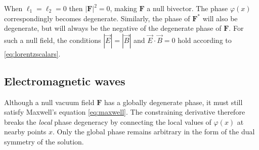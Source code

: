 \documentclass[1p,sort&compress]{elsarticle}
\numberwithin{equation}{section}
\newcommand{\rv}[1]{\vec{#1}}
\newcommand{\bv}[1]{\mathbf{#1}}
\begin{document}
When $\ell_1 = \ell_2 = 0$ then $|\bv{F}|^2 = 0$, making $\bv{F}$ a null bivector.  The phase $\varphi(x)$ correspondingly becomes degenerate.  Similarly, the phase of $\bv{F}^*$ will also be degenerate, but will always be the negative of the degenerate phase of $\bv{F}$.  For such a null field, the conditions $|\rv{E}| = |\rv{B}|$ and $\rv{E}\cdot\rv{B} = 0$ hold according to \eqref{eq:lorentzscalars}.  


\subsection{Electromagnetic waves}\label{sec:waves}


Although a null vacuum field $\bv{F}$ has a globally degenerate phase, it must still satisfy Maxwell's equation \eqref{eq:maxwell}.  The constraining derivative therefore breaks the \emph{local} phase degeneracy by connecting the local values of $\varphi(x)$ at nearby points $x$.  Only the global phase remains arbitrary in the form of the dual symmetry of the solution.



\end{document}
